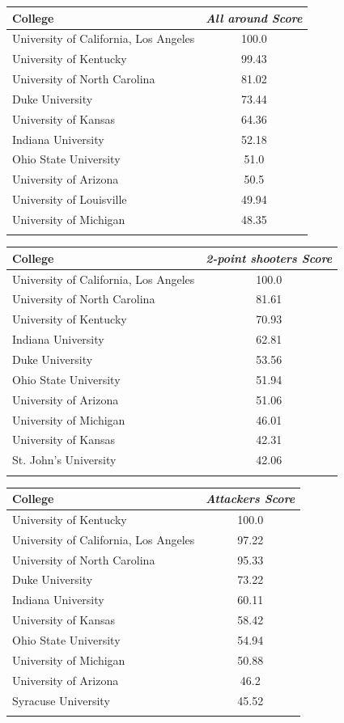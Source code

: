 \documentclass[10.5pt,a4paper,twocolumn]{article}
\begin{document}
\begin{table}[t]
	\begin{tabular}{lc}
		College & \textit{All around Score}  \\
		\hline
		University of California, Los Angeles & 100.0\\
		University of Kentucky & 99.43\\
		University of North Carolina & 81.02\\
		Duke University & 73.44\\
		University of Kansas & 64.36\\
		Indiana University & 52.18\\
		Ohio State University & 51.0\\
		University of Arizona & 50.5\\
		University of Louisville & 49.94\\
		University of Michigan & 48.35\\
		&\\
		
	\end{tabular}
	
	\begin{tabular}{lc}
		College & \textit{2-point shooters Score}  \\
		\hline
		University of California, Los Angeles & 100.0\\
		University of North Carolina & 81.61\\
		University of Kentucky & 70.93\\
		Indiana University & 62.81\\
		Duke University & 53.56\\
		Ohio State University & 51.94\\
		University of Arizona & 51.06\\
		University of Michigan & 46.01\\
		University of Kansas & 42.31\\
		St. John's University & 42.06\\
		&\\
		
	\end{tabular}
	
	\begin{tabular}{lc}
		College & \textit{Attackers Score}  \\
		\hline
		University of Kentucky & 100.0\\
		University of California, Los Angeles & 97.22\\
		University of North Carolina & 95.33\\
		Duke University & 73.22\\
		Indiana University & 60.11\\
		University of Kansas & 58.42\\
		Ohio State University & 54.94\\
		University of Michigan & 50.88\\
		University of Arizona & 46.2\\
		Syracuse University & 45.52\\
		&\\
		

\end{tabular}
\end{table}
\end{document}
